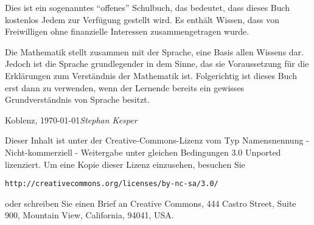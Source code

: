 \preface

Dies ist ein sogenanntes "`offenes"' Schulbuch, das bedeutet, dass dieses Buch kostenlos Jedem zur Verfügung gestellt wird. Es enthält Wissen, dass von Freiwilligen ohne finanzielle Interessen zusammengetragen wurde. 


Die Mathematik stellt zusammen mit der Sprache, eine Basis allen Wissens dar. Jedoch ist die Sprache grundlegender in dem Sinne, das sie Voraussetzung für die Erklärungen zum Verständnis der Mathematik ist. Folgerichtig ist dieses Buch erst dann zu verwenden, wenn der Lernende bereits ein gewisses Grundverständnis von Sprache besitzt. 

\vspace{\baselineskip}
\begin{flushright}\noindent
Koblenz, \today \hfill {\it Stephan Kesper}
\end{flushright}

\vfill

\noindent Dieser Inhalt ist unter der Creative-Commons-Lizenz vom Typ Namensnennung - Nicht-kommerziell - Weitergabe unter gleichen Bedingungen 3.0 Unported lizenziert. Um eine Kopie dieser Lizenz einzusehen, besuchen Sie

\bigskip
\begin{center}
\texttt{http://creativecommons.org/licenses/by-nc-sa/3.0/}
\end{center}

\bigskip

\noindent oder schreiben Sie einen Brief an Creative Commons, 444 Castro Street, Suite 900, Mountain View, California, 94041, USA.


